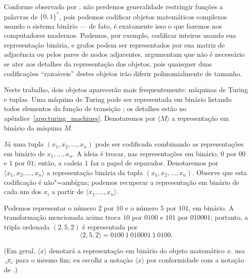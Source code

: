 Conforme observado por ,
não perdemos generalidade restringir funções a palavras de $\{0, 1\}^*$,
pois podemos codificar objetos matemáticos complexos usando o sistema binário
--- de fato,
é exatamente isso o que fazemos nos computadores modernos.
Podemos, por exemplo,
codificar inteiros usando sua representação binária,
e grafos podem ser representados por sua matriz de adjacência
ou pelos pares de nodos adjacentes.
 argumentam que
não é necessário se ater aos detalhes da representação dos objetos,
pois quaisquer duas codificações ``razoáveis'' destes objetos
irão diferir polinomialmente de tamanho.

Neste trabalho,
dois objetos aparecerão mais frequentemente:
máquinas de Turing e tuplas.
Uma máquina de Turing pode ser representada em binário
listando todos elementos da função de transição
\cite[p.~182]{HopcroftUllman1979};
os detalhes estão no apêndice~\ref{app:turing_machines}.
Denotaremos por $\langle M \rangle$ a representação em binário da máquina $M$.

Já uma tupla $(x_1, x_2, \dots, x_n)$ pode ser codificada
combinando as representações em binário de $x_1, \dots, x_n$.
A ideia é trocar, nas representações em binário,
$0$ por $00$ e $1$ por $01$;
então, a cadeia $1$ faz o papel de separador.
Denotaremos por $\langle x_1, x_2, \dots, x_n \rangle$
a representação binária da tupla $(x_1, x_2, \dots, x_n)$.
Observe que esta codificação é não"=ambígua;
podemos recuperar a representação em binário de cada um dos $x_i$
a partir de $\langle x_1, \dots, x_n \rangle$.

\begin{example}
    Podemos representar o número $2$ por $10$ e o número $5$ por $101$,
    em binário.
    A transformação mencionada acima troca $10$ por $0100$
    e $101$ por $010001$;
    portanto, a tripla ordenada $(2, 5, 2)$ é representada por
    \begin{equation*}
        \langle 2, 5, 2 \rangle = 0100\ 1\ 010001\ 1\ 0100.
    \end{equation*}
\end{example}

(Em geral, $\langle x \rangle$ denotará a representação em binário
do objeto matemático $x$.
 usa
$\sideset{_\llcorner}{_\lrcorner}{\mathop{\makebox[0.5ex]{$x$}}}$
para o mesmo fim;
eu escolhi a notação $\langle x \rangle$
por conformidade com a notação de .)

